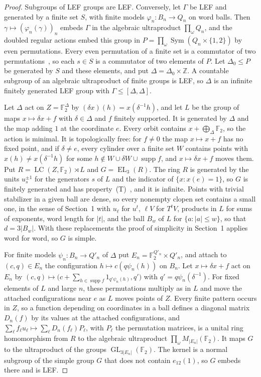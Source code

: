 \documentclass[11pt]{amsart}
\newcommand{\F}{\mathbb F}
\newcommand{\Z}{\mathbb Z}
\newcommand{\LC}{\operatorname{LC}}
\newcommand{\EL}{\operatorname{EL}}
\newcommand{\GL}{\operatorname{GL}}
\begin{document}
\begin{proof}
Subgroups of LEF groups are LEF. Conversely, let $\Gamma$ be LEF and
generated by a finite set $S$, with finite models
$\varphi_n\colon B_n\to Q_n$ on word balls. Then
$\gamma\mapsto(\varphi_n(\gamma))_n$ embeds $\Gamma$ in the algebraic
ultraproduct $\prod_\omega Q_n$, and the doubled regular actions embed
this group in $P=\prod_\omega\operatorname{Sym}(Q_n\times\{1,2\})$ by even
permutations. Every even permutation of a finite set is a commutator of
two permutations~\cite[Theorem~1]{Ore}, so each $s\in S$ is a commutator
of two elements of $P$. Let $\Delta_0\le P$ be generated by $S$ and these
elements, and put $\Delta=\Delta_0\times\Z$. A countable subgroup of an
algebraic ultraproduct of finite groups is LEF, so $\Delta$ is an
infinite finitely generated LEF group with $\Gamma\le[\Delta,\Delta]$.

Let $\Delta$ act on $Z=\F_2^{\Delta}$ by $(\delta x)(h)=x(\delta^{-1}h)$,
and let $L$ be the group of maps $x\mapsto\delta x+f$ with
$\delta\in\Delta$ and $f$ finitely supported. It is generated by $\Delta$
and the map adding $1$ at the coordinate $e$. Every orbit contains
$x+\bigoplus_\Delta\F_2$, so the action is minimal. It is topologically
free: for $f\ne0$ the map $x\mapsto x+f$ has no fixed point, and if
$\delta\ne e$, every cylinder over a finite set $W$ contains points with
$x(h)\ne x(\delta^{-1}h)$ for some
$h\notin W\cup\delta W\cup\operatorname{supp}f$, and $x\mapsto\delta x+f$
moves them. Put $R=\LC(Z,\F_2)\rtimes L$ and $G=\EL_3(R)$. The ring $R$
is generated by the units $u_s^{\pm1}$ for the generators $s$ of $L$ and
the indicator of $\{x:x(e)=1\}$, so $G$ is finitely generated and has
property~\textup{(T)}~\cite[Theorem~1.1]{EJZ}, and it is infinite. Points
with trivial stabilizer in a given ball are dense, so every nonempty
clopen set contains a small one, in the sense of Section~1 with $u_\ell$
for $u^t$, $\ell V$ for $T^tV$, products in $L$ for sums of exponents,
word length for $|t|$, and the ball $B_w$ of $L$ for $\{a:|a|\le w\}$, so
that $d=3|B_w|$. With these replacements the proof of
simplicity in Section~1 applies word for word, so $G$ is simple.

For finite models $\psi_n\colon B_n\to Q'_n$ of $\Delta$ put
$E_n=\F_2^{Q'_n}\times Q'_n$, and attach to $(c,q)\in E_n$ the
configuration $h\mapsto c(q\psi_n(h))$ on $B_n$. Let $x\mapsto\delta x+f$
act on $E_n$ by
$(c,q)\mapsto\bigl(c+\sum_{h\in\operatorname{supp}f}1_{q'\psi_n(h)},q'\bigr)$
with $q'=q\psi_n(\delta^{-1})$. For fixed elements of $L$ and large $n$,
these permutations multiply as in $L$ and move the attached
configurations near $e$ as $L$ moves points of $Z$. Every finite pattern
occurs in $Z$, so a function depending on coordinates in a ball defines a
diagonal matrix $D_n(f)$ by its values at the attached configurations,
and $\sum_\ell f_\ell u_\ell\mapsto\sum_\ell D_n(f_\ell)P_\ell$, with
$P_\ell$ the permutation matrices, is a unital ring homomorphism from $R$
to the algebraic ultraproduct $\prod_\omega M_{|E_n|}(\F_2)$. It maps $G$
to the ultraproduct of the groups $\GL_{3|E_n|}(\F_2)$. The kernel is a
normal subgroup of the simple group $G$ that does not contain
$e_{12}(1)$, so $G$ embeds there and is LEF.


\end{proof}
\end{document}
